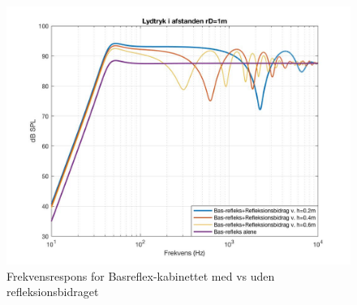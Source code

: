 \begin{figure}[h!]
	\centering
	\includegraphics[width=.8\textwidth]{Pics/sim_samletrespons2}
	\caption{Frekvensrespons for Basreflex-kabinettet med vs uden refleksionsbidraget} 
	\label{fig:sim_samletrespons}
\end{figure}

